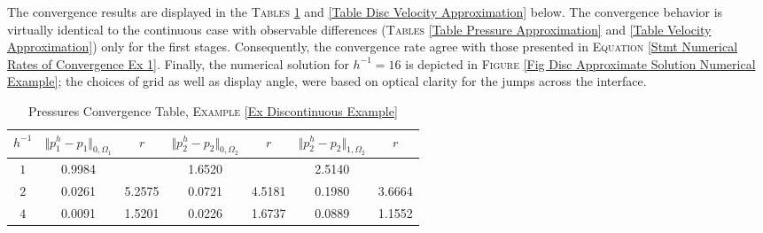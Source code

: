 \documentclass[3p]{elsarticle}
\def\uone{\mathbf{u}_{1}}
\def\uoneh{\mathbf{u}_{1}^{h}}
\def\utwo{\mathbf{u}_{2}}
\def\utwoh{\mathbf{u}_{2}^{h}}
\def\Hdiv{\mathbf{H_{div}}}
\def\pone{p_{1}}
\def\poneh{p_{1}^{h}}
\def\ptwo{p_{2}}
\def\ptwoh{p_{2}^{h}}
\begin{document}
\begin{example}
The convergence results are displayed in the \textsc{Tables} \ref{Table Disc Pressure Approximation} and \ref{Table Disc Velocity Approximation} below. The convergence behavior is virtually identical to the continuous case with observable differences (\textsc{Tables} \ref{Table Pressure Approximation} and \ref{Table Velocity Approximation}) only for the first stages. Consequently, the convergence rate agree with those presented in \textsc{Equation} \eqref{Stmt Numerical Rates of Convergence Ex 1}.
Finally, the numerical solution for $ h^{-1} = 16 $ is depicted in \textsc{Figure} \ref{Fig Disc Approximate Solution Numerical Example}; the choices of grid as well as display angle, were based on optical clarity for the jumps across the interface.
%
\begin{table}[h!]
\caption{Pressures Convergence Table, \textsc{Example} \ref{Ex Discontinuous Example}}\label{Table Disc Pressure Approximation}
\def\arraystretch{1.4}
\begin{center}
\begin{tabular}{ c c c c c c c }
    \hline
    \rowcolor{gray!50}
$h^{-1}$  
& $\Vert  \poneh- p_{1}  \Vert_{ 0, \Omega_{1} } $ 
& $r$  
& $\Vert  \ptwoh- p_{2}  \Vert_{0, \Omega_{2} }$ 
& $r$
& $\Vert  \ptwoh- p_{2}  \Vert_{1, \Omega_{2} }$ 
& $r$ \\ %
    \toprule
$ 1 $ &   0.9984  & &  1.6520  & &  2.5140  & \\
$ 2 $  &  0.0261  & 5.2575 &  0.0721  & 4.5181   &  0.1980  & 3.6664  \\
$ 4 $ &   0.0091  & 1.5201 &  0.0226  & 1.6737    &  0.0889  & 1.1552  \\

\end{tabular}
\end{center}
\end{table}
\end{example}
\end{document}
